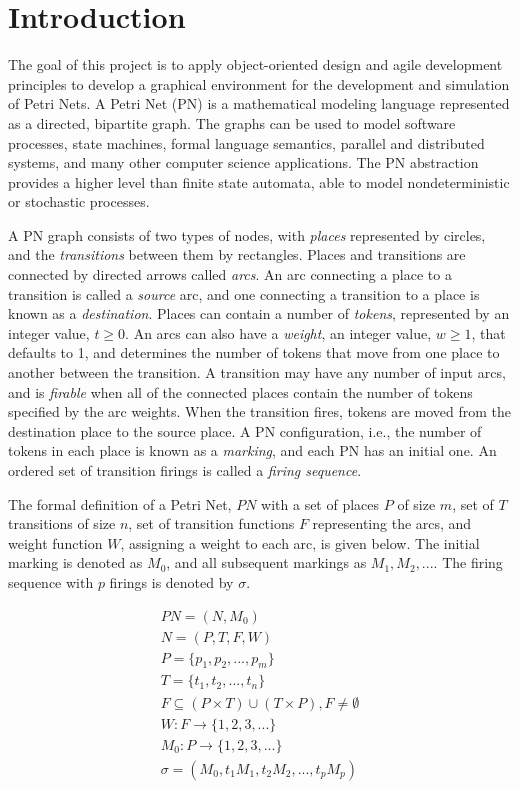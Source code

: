 
\section{Introduction}

The goal of this project is to apply object-oriented design and agile development principles to
develop a graphical environment for the development and simulation of Petri Nets.
A Petri Net (PN) is a mathematical modeling language represented as a directed, bipartite graph. The
graphs can be used to model software processes, state machines, formal language semantics,
parallel and distributed systems, and many other computer science applications. The PN
abstraction provides a higher level than finite state automata, able to model nondeterministic
or stochastic processes.

A PN graph consists of two types of nodes, with \textit{places} represented by circles, and
the \textit{transitions} between them by rectangles. Places and transitions are connected by
directed arrows called \textit{arcs}. An arc connecting a place to a transition is called a
\textit{source} arc, and one connecting a transition to a place is known as a \textit{destination}.
Places can contain a number of \textit{tokens}, represented by an integer value, $t \geq 0$.
An arcs can also have a \textit{weight}, an integer value, $w \geq 1$, that defaults to 1, and
determines the number of tokens that move from one place to another between the transition. A
transition may have any number of input arcs, and is \textit{firable} when all of the connected
places contain the number of tokens specified by the arc weights. When the transition fires, tokens
are moved from the destination place to the source place. A PN configuration, i.e., the number of
tokens in each place is known as a \textit{marking}, and each PN has an initial one. An ordered
set of transition firings is called a \textit{firing sequence}.

The formal definition of a Petri Net, $PN$ with a set of places $P$ of size $m$, set of $T$
transitions of size $n$, set of transition functions $F$ representing the arcs, and weight function
$W$, assigning a weight to each arc, is given below. The initial marking is denoted as $M_0$, and all
subsequent markings as $M_1, M_2, ...$. The firing sequence with $p$ firings is denoted by $\sigma$.

\begin{align*}
PN = (N, M_0) \\
N = (P, T, F, W) \\
P = \{ p_1, p_2, ..., p_m \} \\
T = \{ t_1, t_2, ..., t_n \} \\
F \subseteq (P \times T) \cup (T \times P), F \neq \emptyset \\
W: F \rightarrow \{ 1, 2, 3, ... \} \\
M_0: P \rightarrow \{ 1, 2, 3, ... \} \\
\sigma = (M_0, t_1M_1, t_2M_2, ..., t_pM_p) \\
\end{align*}

